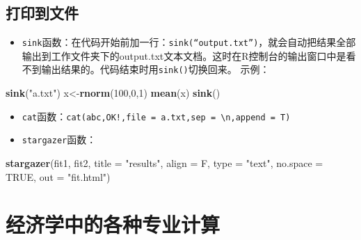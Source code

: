 \documentclass[
]{book}
\newenvironment{Shaded}{\begin{snugshade}}{\end{snugshade}}
\newcommand{\DataTypeTok}[1]{\textcolor[rgb]{0.13,0.29,0.53}{#1}}
\newcommand{\DecValTok}[1]{\textcolor[rgb]{0.00,0.00,0.81}{#1}}
\newcommand{\KeywordTok}[1]{\textcolor[rgb]{0.13,0.29,0.53}{\textbf{#1}}}
\newcommand{\NormalTok}[1]{#1}
\newcommand{\OtherTok}[1]{\textcolor[rgb]{0.56,0.35,0.01}{#1}}
\newcommand{\StringTok}[1]{\textcolor[rgb]{0.31,0.60,0.02}{#1}}
\providecommand{\tightlist}{%
  \setlength{\itemsep}{0pt}\setlength{\parskip}{0pt}}
\begin{document}
\hypertarget{ux6253ux5370ux5230ux6587ux4ef6}{%
\section{打印到文件}\label{ux6253ux5370ux5230ux6587ux4ef6}}

\begin{itemize}
\tightlist
\item
  \texttt{sink}函数：在代码开始前加一行：\texttt{sink(“output.txt”)}，就会自动把结果全部输出到工作文件夹下的output.txt文本文档。这时在R控制台的输出窗口中是看不到输出结果的。代码结束时用\texttt{sink()}切换回来。 示例：
\end{itemize}

\begin{Shaded}
\begin{Highlighting}[]
\KeywordTok{sink}\NormalTok{(}\StringTok{"a.txt"}\NormalTok{) }
\NormalTok{x<-}\KeywordTok{rnorm}\NormalTok{(}\DecValTok{100}\NormalTok{,}\DecValTok{0}\NormalTok{,}\DecValTok{1}\NormalTok{) }
\KeywordTok{mean}\NormalTok{(x) }
\KeywordTok{sink}\NormalTok{()}
\end{Highlighting}
\end{Shaded}

\begin{itemize}
\tightlist
\item
  \texttt{cat}函数：\texttt{cat(\textquotesingle{}abc\textquotesingle{},\textquotesingle{}OK!\textquotesingle{},file\ =\ \textquotesingle{}a.txt\textquotesingle{},sep\ =\ \textquotesingle{}\textbackslash{}n\textquotesingle{},append\ =\ T)}
\item
  \texttt{stargazer}函数：
\end{itemize}

\begin{Shaded}
\begin{Highlighting}[]
\KeywordTok{stargazer}\NormalTok{(fit1, fit2, }\DataTypeTok{title =} \StringTok{"results"}\NormalTok{, }\DataTypeTok{align =}\NormalTok{ F, }\DataTypeTok{type =} \StringTok{"text"}\NormalTok{, }\DataTypeTok{no.space =} \OtherTok{TRUE}\NormalTok{, }\DataTypeTok{out =} \StringTok{"fit.html"}\NormalTok{)}
\end{Highlighting}
\end{Shaded}

\hypertarget{Eco}{%
\chapter{经济学中的各种专业计算}\label{Eco}}
\end{document}
